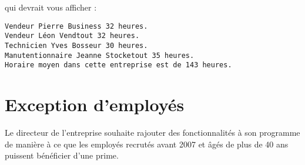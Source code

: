\documentclass[a4paper]{article}
\begin{document}
qui devrait vous afficher :

\begin{lstlisting}
Vendeur Pierre Business 32 heures.
Vendeur Léon Vendtout 32 heures.
Technicien Yves Bosseur 30 heures.
Manutentionnaire Jeanne Stocketout 35 heures.
Horaire moyen dans cette entreprise est de 143 heures.
\end{lstlisting}

\section{Exception d’employés}

Le directeur de l'entreprise souhaite rajouter des fonctionnalités à son programme de manière à ce que les employés recrutés avant 2007 et âgés de plus de 40 ans puissent bénéficier d'une prime.












\end{document}
